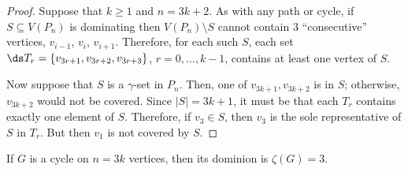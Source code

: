 \documentclass[twoside,12pt]{article}
\begin{document}
\begin{proof}
	Suppose that $k\ge 1$ and $n=3k+2$. As with any path or cycle, if $S\subseteq V(P_n)$ is dominating then $V(P_n)\setminus S$ cannot contain 3 ``consecutive'' vertices, $v_{i-1}$, $v_i$, $v_{i+1}$. Therefore, for each such $S$, each set $\ds T_r=\{v_{3r+1},v_{3r+2},v_{3r+3}\}$, $r=0,\ldots, k-1$, contains at least one vertex of $S$.
	
	\indent Now suppose that $S$ is a $\gamma$-set in $P_{n}$. Then, one of $v_{3k+1}, v_{3k+2}$ is in $S$; otherwise, $v_{3k+2}$ would not be covered. Since $|S|=3k+1$, it must be that each $T_r$ contains exactly one element of $S$. Therefore, if $v_3\in S$, then  $v_3$ is the sole representative of $S$ in $T_r$. But then $v_1$ is not covered by $S$.
\end{proof}
\begin{corollary}{\label{CC}}
If $G$ is a cycle on $n=3k$ vertices, then its dominion is
$\zeta(G)=3$.
\end{corollary}

	
\end{document}
